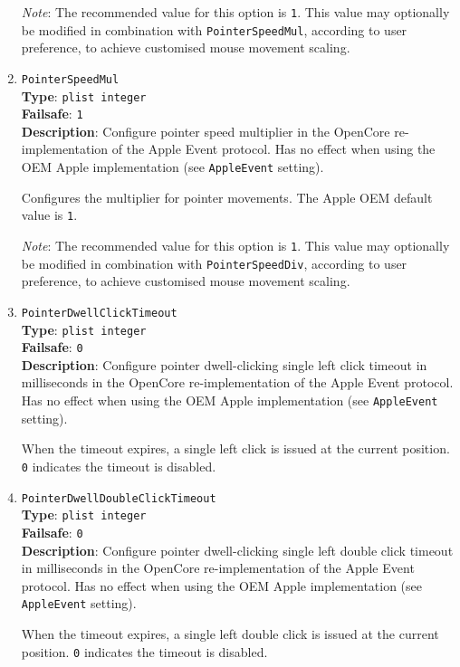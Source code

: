 \documentclass[]{article}
\begin{document}
\begin{enumerate}
  \emph{Note}: The recommended value for this option is \texttt{1}. This value may
  optionally be modified in combination with \texttt{PointerSpeedMul}, according to user
  preference, to achieve customised mouse movement scaling.

\item
  \texttt{PointerSpeedMul}\\
  \textbf{Type}: \texttt{plist\ integer}\\
  \textbf{Failsafe}: \texttt{1}\\
  \textbf{Description}: Configure pointer speed multiplier in the OpenCore re-implementation
  of the Apple Event protocol.
  Has no effect when using the OEM Apple implementation (see \texttt{AppleEvent} setting).

  Configures the multiplier for pointer movements. The Apple OEM default value is \texttt{1}.

  \emph{Note}: The recommended value for this option is \texttt{1}. This value may
  optionally be modified in combination with \texttt{PointerSpeedDiv}, according to user
  preference, to achieve customised mouse movement scaling.

\item
  \texttt{PointerDwellClickTimeout}\\
  \textbf{Type}: \texttt{plist\ integer}\\
  \textbf{Failsafe}: \texttt{0}\\
  \textbf{Description}: Configure pointer dwell-clicking single left click timeout in
  milliseconds in the OpenCore re-implementation of the Apple Event protocol.
  Has no effect when using the OEM Apple implementation (see \texttt{AppleEvent} setting).

  When the timeout expires, a single left click is issued at the current position.
  \texttt{0} indicates the timeout is disabled.

\item
  \texttt{PointerDwellDoubleClickTimeout}\\
  \textbf{Type}: \texttt{plist\ integer}\\
  \textbf{Failsafe}: \texttt{0}\\
  \textbf{Description}: Configure pointer dwell-clicking single left double click timeout in
  milliseconds in the OpenCore re-implementation of the Apple Event protocol.
  Has no effect when using the OEM Apple implementation (see \texttt{AppleEvent} setting).

  When the timeout expires, a single left double click is issued at the current position.
  \texttt{0} indicates the timeout is disabled.


\end{enumerate}
\end{document}
